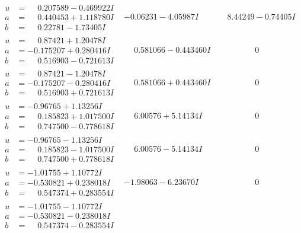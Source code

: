 \documentclass[1p]{elsarticle_modified}
\theoremstyle{definition}
\begin{document}
$$\begin{array}{c|c|c}
\begin{aligned}
u &= \phantom{-}0.207589 - 0.469922 I \\
a &= \phantom{-}0.440453 + 1.118780 I \\
b &= \phantom{-}0.22781 - 1.73405 I\end{aligned}
 & -0.06231 - 4.05987 I & \phantom{-}8.44249 - 0.74405 I \\ \hline\begin{aligned}
u &= \phantom{-}0.87421 + 1.20478 I \\
a &= -0.175207 + 0.280416 I \\
b &= \phantom{-}0.516903 - 0.721613 I\end{aligned}
 & \phantom{-}0.581066 - 0.443460 I & \phantom{-0.000000 } 0 \\ \hline\begin{aligned}
u &= \phantom{-}0.87421 - 1.20478 I \\
a &= -0.175207 - 0.280416 I \\
b &= \phantom{-}0.516903 + 0.721613 I\end{aligned}
 & \phantom{-}0.581066 + 0.443460 I & \phantom{-0.000000 } 0 \\ \hline\begin{aligned}
u &= -0.96765 + 1.13256 I \\
a &= \phantom{-}0.185823 + 1.017500 I \\
b &= \phantom{-}0.747500 - 0.778618 I\end{aligned}
 & \phantom{-}6.00576 + 5.14134 I & \phantom{-0.000000 } 0 \\ \hline\begin{aligned}
u &= -0.96765 - 1.13256 I \\
a &= \phantom{-}0.185823 - 1.017500 I \\
b &= \phantom{-}0.747500 + 0.778618 I\end{aligned}
 & \phantom{-}6.00576 - 5.14134 I & \phantom{-0.000000 } 0 \\ \hline\begin{aligned}
u &= -1.01755 + 1.10772 I \\
a &= -0.530821 + 0.238018 I \\
b &= \phantom{-}0.547374 + 0.283554 I\end{aligned}
 & -1.98063 - 6.23670 I & \phantom{-0.000000 } 0 \\ \hline\begin{aligned}
u &= -1.01755 - 1.10772 I \\
a &= -0.530821 - 0.238018 I \\
b &= \phantom{-}0.547374 - 0.283554 I\end{aligned}

\end{array}$$
\end{document}
